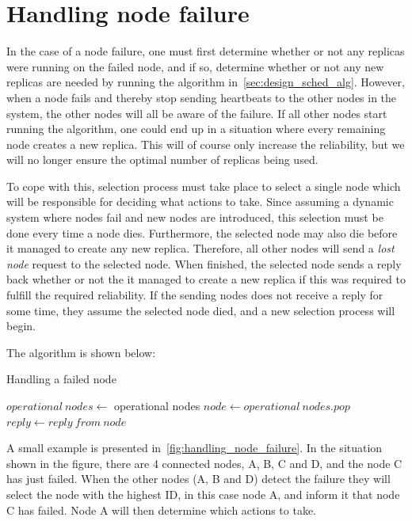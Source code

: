 \documentclass{cslthse-msc}
\begin{document}
\section{Handling node failure} \label{sec:design_handling_failure}
In the case of a node failure, one must first determine whether or not any replicas were running on the failed node, and if so, determine whether or not any new replicas are needed by running the algorithm in~\cref{sec:design_sched_alg}. However, when a node fails and thereby stop sending heartbeats to the other nodes in the system, the other nodes will all be aware of the failure. If all other nodes start running the algorithm, one could end up in a situation where every remaining node creates a new replica. This will of course only increase the reliability, but we will no longer ensure the optimal number of replicas being used. 

To cope with this, selection process must take place to select a single node which will be responsible for deciding what actions to take. Since assuming a dynamic system where nodes fail and new nodes are introduced, this selection must be done every time a node dies. Furthermore, the selected node may also die before it managed to create any new replica. Therefore, all other nodes will send a \emph{lost node} request to the selected node. When finished, the selected node sends a reply back whether or not the it managed to create a new replica if this was required to fulfill the required reliability. If the sending nodes does not receive a reply for some time, they assume the selected node died, and a new selection process will begin.

The algorithm is shown below: %

\begin{algorithm}\label{alg:node_failure}
	\caption{Handling a failed node}
	\begin{algorithmic}[1]
	\State $operational\ nodes\gets $ operational nodes
	\State
	\Do
		\State $node\gets operational\ nodes.pop$
		\State
		\State $reply\gets reply\ from\ node$
	\end{algorithmic}
\end{algorithm}

A small example is presented in~\cref{fig:handling_node_failure}. In the situation shown in the figure, there are 4 connected nodes, A, B, C and D, and the node C has just failed. When the other nodes (A, B and D) detect the failure they will select the node with the highest ID, in this case node A, and inform it that node C has failed. Node A will then determine which actions to take.
\end{document}
